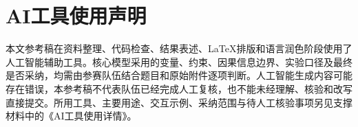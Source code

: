 \section*{AI工具使用声明}
本文参考稿在资料整理、代码检查、结果表述、LaTeX排版和语言润色阶段使用了人工智能辅助工具。核心模型采用的变量、约束、因果信息边界、实验口径及最终是否采纳，均需由参赛队伍结合题目和原始附件逐项判断。人工智能生成内容可能存在错误，本参考稿不代表队伍已经完成人工复核，也不能未经理解、核验和改写直接提交。所用工具、主要用途、交互示例、采纳范围与待人工核验事项另见支撑材料中的《AI工具使用详情》。

